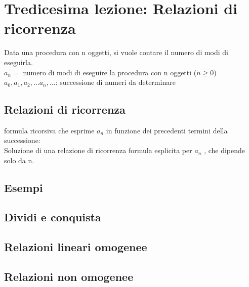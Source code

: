 \section{Tredicesima lezione: Relazioni di ricorrenza}

Data una procedura con n oggetti, si vuole contare il numero di modi di eseguirla.\\
$a_n =$ numero di modi di eseguire la procedura con n oggetti ($n \geq 0$)\\
$a_0, a_1, a_2, \dots a_n, \dots $: successione di numeri da determinare

\subsection{Relazioni di ricorrenza} 
formula ricorsiva che esprime $a_n$ in funzione dei
precedenti termini della successione: \\
Soluzione di una relazione di ricorrenza %
 formula esplicita per $a_n$ , che dipende solo
da n.

\subsection{Esempi}


\subsection{Dividi e conquista}

\subsection{Relazioni lineari omogenee}


\subsection{Relazioni non omogenee}








\newpage